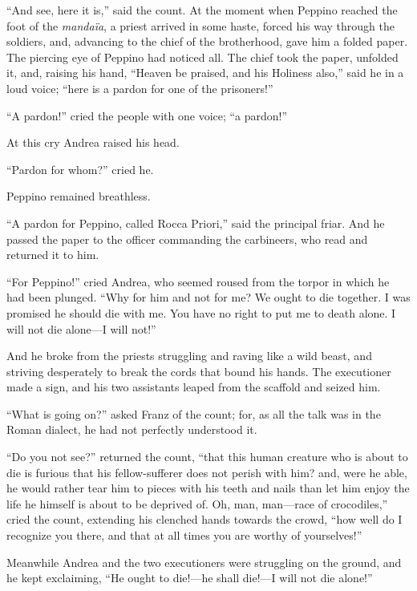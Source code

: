 “And see, here it is,” said the count. At the moment when Peppino
reached the foot of the \textit{mandaïa}, a priest arrived in some haste,
forced his way through the soldiers, and, advancing to the chief of the
brotherhood, gave him a folded paper. The piercing eye of Peppino had
noticed all. The chief took the paper, unfolded it, and, raising his
hand, “Heaven be praised, and his Holiness also,” said he in a loud
voice; “here is a pardon for one of the prisoners!”

“A pardon!” cried the people with one voice; “a pardon!”

At this cry Andrea raised his head.

“Pardon for whom?” cried he.

Peppino remained breathless.

“A pardon for Peppino, called Rocca Priori,” said the principal friar.
And he passed the paper to the officer commanding the carbineers, who
read and returned it to him.

“For Peppino!” cried Andrea, who seemed roused from the torpor in which
he had been plunged. “Why for him and not for me? We ought to die
together. I was promised he should die with me. You have no right to
put me to death alone. I will not die alone—I will not!”

And he broke from the priests struggling and raving like a wild beast,
and striving desperately to break the cords that bound his hands. The
executioner made a sign, and his two assistants leaped from the
scaffold and seized him.

“What is going on?” asked Franz of the count; for, as all the talk was
in the Roman dialect, he had not perfectly understood it.

“Do you not see?” returned the count, “that this human creature who is
about to die is furious that his fellow-sufferer does not perish with
him? and, were he able, he would rather tear him to pieces with his
teeth and nails than let him enjoy the life he himself is about to be
deprived of. Oh, man, man—race of crocodiles,” cried the count,
extending his clenched hands towards the crowd, “how well do I
recognize you there, and that at all times you are worthy of
yourselves!”

Meanwhile Andrea and the two executioners were struggling on the
ground, and he kept exclaiming, “He ought to die!—he shall die!—I will
not die alone!”

